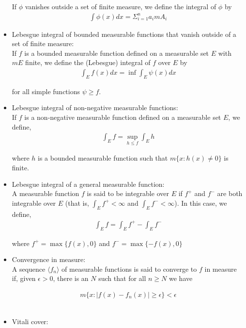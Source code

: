 \documentclass[12pt]{article}
\begin{document}
\begin{itemize}
If $\phi$ vanishes outside a set of finite measure, we define the integral of $\phi$ by
\begin{align*}
\int \phi(x) dx = \Sigma_{i=1}^n a_i mA_i
\end{align*}

\item Lebesgue integral of bounded measurable functions that vanish outside of a set of  finite measure:\\

If $f$ is a bounded measurable function defined on a measurable set $E$ with $mE$ finite, we define the (Lebesgue) integral of $f$ over $E$ by
\begin{align*}
\int_E f(x)dx = \inf \int_E \psi(x) dx
\end{align*}

for all simple functions $\psi \geq f$.
\\
\item Lebesgue integral of non-negative measurable functions:\\

If $f$ is a non-negative measurable function defined on a measurable set $E$, we define,
\begin{align*}
\int_E f = \sup_{h \leq f} \int_E h
\end{align*}

where $h$ is a bounded measurable function such that $m\{x: h(x) \neq 0\}$ is finite.
\\
\item Lebesgue integral of a general measurable function:\\

A measurable function $f$ is said to be integrable over $E$ if $f^+$ and $f^-$ are both integrable over $E$ (that is, $\int_E f^+ < \infty$ and $\int_E f^- < \infty$). In this case, we define,
\begin{align*}
\int_E f = \int_E f^+ - \int_E f^-
\end{align*}

where $f^+ = \max\{f(x), 0\}$ and $f^- = \max\{-f(x), 0\}$
\\
\item Convergence in measure:\\

A sequence $\langle f_n \rangle$ of measurable functions is said to converge to $f$ in measure if, given $\epsilon > 0$, there is an $N$ such that for all $n \geq N$ we have

\begin{align*}
m\{x: |f(x) - f_n(x)| \geq \epsilon\} < \epsilon
\end{align*}
\\
\item Vitali cover:\\


\end{itemize}
\end{document}
